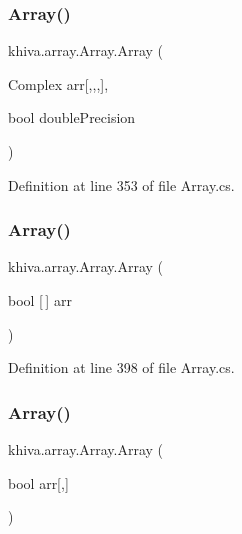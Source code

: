 \subsubsection{\texorpdfstring{Array()}{Array()}\hspace{0.1cm}{\footnotesize\ttfamily [12/46]}}
{\footnotesize\ttfamily khiva.\+array.\+Array.\+Array (\begin{DoxyParamCaption}\item[{Complex}]{arr\mbox{[},,,\mbox{]},  }\item[{bool}]{double\+Precision }\end{DoxyParamCaption})\hspace{0.3cm}{\ttfamily [inline]}}



Definition at line 353 of file Array.\+cs.

\mbox{\label{classkhiva_1_1array_1_1_array_a78f5d47ca205ba9c4f6ef789db4ca172}} 
\subsubsection{\texorpdfstring{Array()}{Array()}\hspace{0.1cm}{\footnotesize\ttfamily [13/46]}}
{\footnotesize\ttfamily khiva.\+array.\+Array.\+Array (\begin{DoxyParamCaption}\item[{bool \mbox{[}$\,$\mbox{]}}]{arr }\end{DoxyParamCaption})\hspace{0.3cm}{\ttfamily [inline]}}



Definition at line 398 of file Array.\+cs.

\mbox{\label{classkhiva_1_1array_1_1_array_a7fdf7bbdff405cc633b82af387d42e59}} 
\subsubsection{\texorpdfstring{Array()}{Array()}\hspace{0.1cm}{\footnotesize\ttfamily [14/46]}}
{\footnotesize\ttfamily khiva.\+array.\+Array.\+Array (\begin{DoxyParamCaption}\item[{bool}]{arr\mbox{[},\mbox{]} }\end{DoxyParamCaption})\hspace{0.3cm}{\ttfamily [inline]}}




